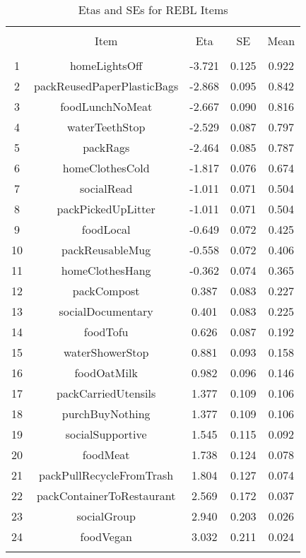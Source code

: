 
\begin{table}[!htbp] \centering 
  \caption{Etas and SEs for REBL Items} 
  \label{} 
\begin{tabular}{@{\extracolsep{5pt}} ccccc} 
\\[-1.8ex]\hline 
\hline \\[-1.8ex] 
 & Item & Eta & SE & Mean \\ 
\hline \\[-1.8ex] 
1 & homeLightsOff & -3.721 & 0.125 & 0.922 \\ 
2 & packReusedPaperPlasticBags & -2.868 & 0.095 & 0.842 \\ 
3 & foodLunchNoMeat & -2.667 & 0.090 & 0.816 \\ 
4 & waterTeethStop & -2.529 & 0.087 & 0.797 \\ 
5 & packRags & -2.464 & 0.085 & 0.787 \\ 
6 & homeClothesCold & -1.817 & 0.076 & 0.674 \\ 
7 & socialRead & -1.011 & 0.071 & 0.504 \\ 
8 & packPickedUpLitter & -1.011 & 0.071 & 0.504 \\ 
9 & foodLocal & -0.649 & 0.072 & 0.425 \\ 
10 & packReusableMug & -0.558 & 0.072 & 0.406 \\ 
11 & homeClothesHang & -0.362 & 0.074 & 0.365 \\ 
12 & packCompost &  0.387 & 0.083 & 0.227 \\ 
13 & socialDocumentary &  0.401 & 0.083 & 0.225 \\ 
14 & foodTofu &  0.626 & 0.087 & 0.192 \\ 
15 & waterShowerStop &  0.881 & 0.093 & 0.158 \\ 
16 & foodOatMilk &  0.982 & 0.096 & 0.146 \\ 
17 & packCarriedUtensils &  1.377 & 0.109 & 0.106 \\ 
18 & purchBuyNothing &  1.377 & 0.109 & 0.106 \\ 
19 & socialSupportive &  1.545 & 0.115 & 0.092 \\ 
20 & foodMeat &  1.738 & 0.124 & 0.078 \\ 
21 & packPullRecycleFromTrash &  1.804 & 0.127 & 0.074 \\ 
22 & packContainerToRestaurant &  2.569 & 0.172 & 0.037 \\ 
23 & socialGroup &  2.940 & 0.203 & 0.026 \\ 
24 & foodVegan &  3.032 & 0.211 & 0.024 \\ 
\hline \\[-1.8ex] 
\end{tabular} 
\end{table} 
